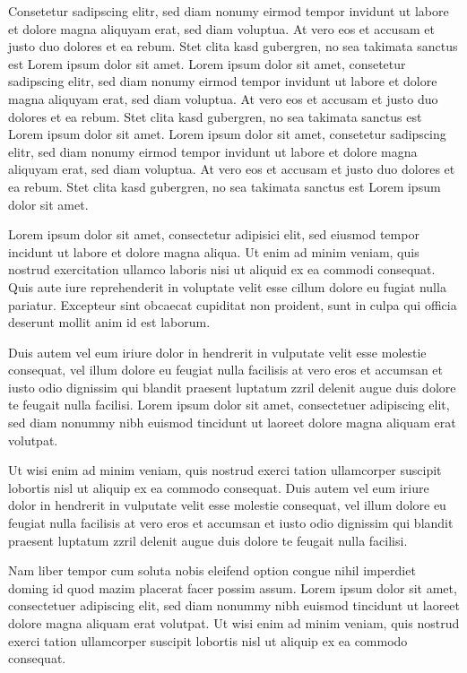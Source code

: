 \documentclass[twoside,a4paper]{article}
\begin{document}
Consetetur sadipscing elitr, sed diam nonumy eirmod tempor invidunt ut labore et dolore magna aliquyam erat, sed diam voluptua. At vero eos et accusam et justo duo dolores et ea rebum. Stet clita kasd gubergren, no sea takimata sanctus est Lorem ipsum dolor sit amet. Lorem ipsum dolor sit amet, consetetur sadipscing elitr, sed diam nonumy eirmod tempor invidunt ut labore et dolore magna aliquyam erat, sed diam voluptua. At vero eos et accusam et justo duo dolores et ea rebum. Stet clita kasd gubergren, no sea takimata sanctus est Lorem ipsum dolor sit amet. Lorem ipsum dolor sit amet, consetetur sadipscing elitr, sed diam nonumy eirmod tempor invidunt ut labore et dolore magna aliquyam erat, sed diam voluptua. At vero eos et accusam et justo duo dolores et ea rebum. Stet clita kasd gubergren, no sea takimata sanctus est Lorem ipsum dolor sit amet.

Lorem ipsum dolor sit amet, consectetur adipisici elit, sed eiusmod tempor incidunt ut labore et dolore magna aliqua. Ut enim ad minim veniam, quis nostrud exercitation ullamco laboris nisi ut aliquid ex ea commodi consequat. Quis aute iure reprehenderit in voluptate velit esse cillum dolore eu fugiat nulla pariatur. Excepteur sint obcaecat cupiditat non proident, sunt in culpa qui officia deserunt mollit anim id est laborum.


Duis autem vel eum iriure dolor in hendrerit in vulputate velit esse molestie consequat, vel illum dolore eu feugiat nulla facilisis at vero eros et accumsan et iusto odio dignissim qui blandit praesent luptatum zzril delenit augue duis dolore te feugait nulla facilisi. Lorem ipsum dolor sit amet, consectetuer adipiscing elit, sed diam nonummy nibh euismod tincidunt ut laoreet dolore magna aliquam erat volutpat.

Ut wisi enim ad minim veniam, quis nostrud exerci tation ullamcorper suscipit lobortis nisl ut aliquip ex ea commodo consequat. Duis autem vel eum iriure dolor in hendrerit in vulputate velit esse molestie consequat, vel illum dolore eu feugiat nulla facilisis at vero eros et accumsan et iusto odio dignissim qui blandit praesent luptatum zzril delenit augue duis dolore te feugait nulla facilisi.

Nam liber tempor cum soluta nobis eleifend option congue nihil imperdiet doming id quod mazim placerat facer possim assum. Lorem ipsum dolor sit amet, consectetuer adipiscing elit, sed diam nonummy nibh euismod tincidunt ut laoreet dolore magna aliquam erat volutpat. Ut wisi enim ad minim veniam, quis nostrud exerci tation ullamcorper suscipit lobortis nisl ut aliquip ex ea commodo consequat.
\end{document}
